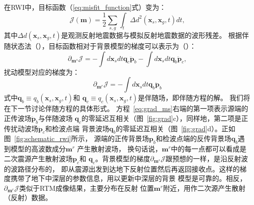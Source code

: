 在RWI中，目标函数（\ref{eq:misfit_function}式）变为：
\begin{equation}
    \mathcal{J}(\mathbf{m})=\frac{1}{2}\sum_{s,g}\int_t\Delta d^2(\mathbf{x}_s,\mathbf{x}_g,t)dt,
	\label{eq:misfit_function1}
\end{equation}
其中$\Delta d(\mathbf{x}_s,\mathbf{x}_g,t)$是观测反射地震数据与模拟反射地震数据的波形残差。
根据伴随状态法（），目标函数相对于背景模型的梯度可以表示为（）：
\begin{equation}
	\partial_{\mathbf{m}^s}\mathcal{J}=-\int d\mathbf{x}_sdt\mathbf{q}_c\ddot{\mathbf{p}}_b
	-\int d\mathbf{x}_sdt\mathbf{q}_b\ddot{\mathbf{p}}_c,
	\label{eq:grad_ms}
\end{equation}
扰动模型对应的梯度为：
\begin{equation}
	\partial_{\mathbf{m}^r}\mathcal{J}=-\int d\mathbf{x}_sdt\mathbf{q}_b\ddot{\mathbf{p}}_b
\end{equation}
式中$\mathbf{q}_b\equiv q_b(\mathbf{x}_s,\mathbf{x}_g,t)$和
$\mathbf{q}_c\equiv q_c(\mathbf{x}_s,\mathbf{x}_g,t)$是伴随场，即伴随方程的解。
我们将在下一节讨论伴随方程的具体形式。
方程~\ref{eq:grad_ms}右端的第一项表示源端的正传波场$\ddot{\mathbf{p}}_b$与伴随波场
$\mathbf{q}_c$的零延迟互相关（图~\ref{fig:grad}c），同样地，第二项是正传扰动波场$\ddot{\mathbf{p}}_c$和检波点端
背景波场$\mathbf{q}_b$的零延迟互相关（图~\ref{fig:grad}d）。正如图~\ref{fig:schematic_rwi}所示，
源端的正传背景场$\mathbf{p}_b$和检波点端的反传背景场$\mathbf{q}_b$遇到模型的高波数成分$\mathbf{m}^r$
产生散射波场，
换句话说，$\mathbf{m}^r$中的每一点都可以看成是二次震源产生散射波场$\mathbf{p}_c$和
$\mathbf{q}_c$。背景模型的梯度$\partial_{\mathbf{m}^s}\mathcal{J}$跟预想的一样，是沿反射波的波路径分布的，
即从震源出发到达地下反射位置然后再返回接收点。这样的梯度携带了地下中深层的参数信息，用以更新中深层的背景
模型是可靠的。相反，$\partial_{\mathbf{m}^r}\mathcal{J}$类似于RTM成像结果，主要分布在反射
位置$\mathbf{m}^r$附近，用作二次源产生散射（反射）数据。

\vspace{0.9cm}
